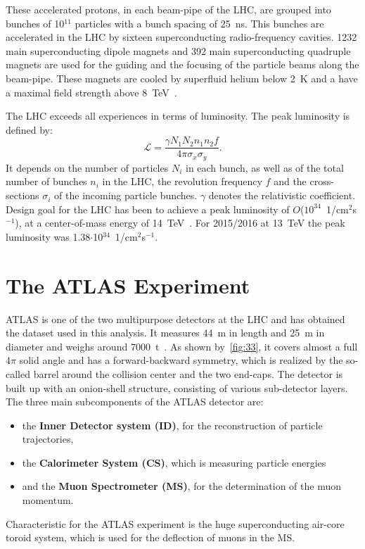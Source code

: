  These accelerated protons, in each beam-pipe of the LHC, are grouped into bunches of 10$^{11}$ particles with a bunch spacing of 25~ns. This bunches are accelerated in the LHC by sixteen superconducting radio-frequency cavities. 1232 main superconducting dipole magnets and 392 main superconducting quadruple magnets are used for the guiding and the focusing of the particle beams along the beam-pipe. These magnets are cooled by superfluid helium below 2~K and a have a maximal field strength above 8~TeV~\cite{Evans:2008zzb}.   


 The LHC  exceeds all experiences in terms of luminosity. The peak luminosity is defined by:
\begin{equation}
\mathscr{L} = \frac{\gamma N_1N_2n_1n_2f}{4\pi \sigma_x \sigma_y }.
\end{equation}
 It depends on the number of particles $N_i$ in each bunch, as well as of the total number of bunches $n_i$ in the LHC, the revolution frequency $f$ and the cross-sections $\sigma_i$ of the incoming particle bunches. $\gamma$ denotes the relativistic coefficient. Design goal for the LHC has been to achieve a peak luminosity of $O$($10^{34}$~1/cm$^2$s$^{-1}$), at a center-of-mass energy of 14~TeV~\cite{Bruning:2004ej}. For 2015/2016 at 13~TeV the peak luminosity was 1.38$\cdot$10$^{34}$~1/cm$^2$s$^{-1}$.  
 
 
\section{The ATLAS Experiment}\label{ATLAS}
 ATLAS  is one of the two multipurpose detectors at the LHC and has obtained the dataset used in this analysis. It measures 44~m in length and 25~m in diameter and weighs around 7000~t~\cite{Aad:2008zzm}. 
 As shown by~\cref{fig:33}, it covers almost a full 4$\pi$ solid angle and has a forward-backward symmetry, which is realized by the so-called barrel around the collision center and the two end-caps. The detector is built up with an onion-shell structure, consisting of various sub-detector layers. The three main subcomponents of the ATLAS detector are:
 \begin{itemize}
 	\item the \textbf{Inner Detector system (ID)}, for the reconstruction of particle trajectories, 
 	\item  the \textbf{Calorimeter System (CS)}, which is measuring particle energies
 	\item  and the \textbf{Muon Spectrometer (MS)}, for the determination of the muon momentum.
 \end{itemize} 
Characteristic for the ATLAS experiment is the huge superconducting air-core toroid system, which is used for the deflection of muons in the MS. 

